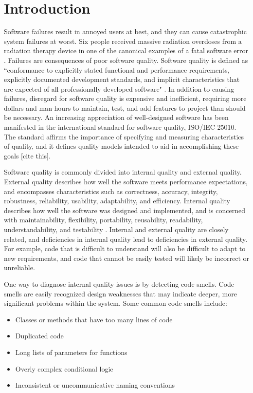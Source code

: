 \documentclass{sig-alternate}
\begin{document}
\section{Introduction}
\label{sec:intro}
Software failures result in annoyed users at best, and they can cause catastrophic system failures at worst. Six people received massive radiation overdoses from a radiation therapy device in one of the canonical examples of a fatal software error \cite{leveson1995therac}. Failures are consequences of poor software quality. Software quality is defined as ``conformance to explicitly stated functional and performance requirements, explicitly documented development standards, and implicit characteristics that are expected of all professionally developed software" \cite{pressman1997}. In addition to causing failures, disregard for software quality is expensive and inefficient, requiring more dollars and man-hours to maintain, test, and add features to project than should be necessary. An increasing appreciation of well-designed software has been manifested in the international standard for software quality, ISO/IEC 25010. The standard affirms the importance of specifying and measuring characteristics of quality, and it defines quality models intended to aid in accomplishing these goals [cite this].

Software quality is commonly divided into internal quality and external quality. External quality describes how well the software meets performance expectations, and encompasses characteristics such as correctness, accuracy, integrity, robustness, reliability, usability, adaptability, and efficiency. Internal quality describes how well the software was designed and implemented, and is concerned with maintainability, flexibility, portability, reusability, readability, understandability, and testability \cite{mcconnell1993codecomplete}. Internal and external quality are closely related, and deficiencies in internal quality lead to deficiencies in external quality. For example, code that is difficult to understand will also be difficult to adapt to new requirements, and code that cannot be easily tested will likely be incorrect or unreliable. 



One way to diagnose internal quality issues is by detecting code smells. Code smells are easily recognized design weaknesses that may indicate deeper, more significant problems within the system. Some common code smells include:
\begin{itemize}
\item Classes or methods that have too many lines of code
\item Duplicated code
\item Long lists of parameters for functions
\item Overly complex conditional logic
\item Inconsistent or uncommunicative naming conventions
\end{itemize}
\end{document}
